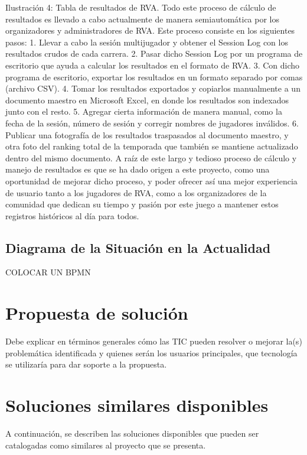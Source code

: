 Ilustración 4: Tabla de resultados de RVA.
Todo este proceso de cálculo de resultados es llevado a cabo actualmente de manera semiautomática por los organizadores y administradores de RVA. Este proceso consiste en los siguientes pasos:
1.	Llevar a cabo la sesión multijugador y obtener el Session Log con los resultados crudos de cada carrera.
2.	Pasar dicho Session Log por un programa de escritorio que ayuda a calcular los resultados en el formato de RVA.
3.	Con dicho programa de escritorio, exportar los resultados en un formato separado por comas (archivo CSV).
4.	Tomar los resultados exportados y copiarlos manualmente a un documento maestro en Microsoft Excel, en donde los resultados son indexados junto con el resto.
5.	Agregar cierta información de manera manual, como la fecha de la sesión, número de sesión y corregir nombres de jugadores inválidos.
6.	Publicar una fotografía de los resultados traspasados al documento maestro, y otra foto del ranking total de la temporada que también se mantiene actualizado dentro del mismo documento.
A raíz de este largo y tedioso proceso de cálculo y manejo de resultados es que se ha dado origen a este proyecto, como una oportunidad de mejorar dicho proceso, y poder ofrecer así una mejor experiencia de usuario tanto a los jugadores de RVA, como a los organizadores de la comunidad que dedican su tiempo y pasión por este juego a mantener estos registros históricos al día para todos.

\subsection{Diagrama de la Situación en la Actualidad}
COLOCAR UN BPMN

\section{Propuesta de solución}
Debe explicar en términos generales cómo las TIC pueden resolver o mejorar la(s) problemática identificada y quienes serán los usuarios principales, que tecnología se utilizaría para dar soporte a la propuesta.

\section{Soluciones similares disponibles}
A continuación, se describen las soluciones disponibles que pueden ser catalogadas como similares al proyecto que se presenta.

